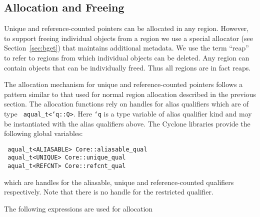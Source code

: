 \subsection{Allocation and Freeing}
\label{sec:allocandfree}

Unique and reference-counted pointers can be allocated in any
region. However, to support freeing individual objects from a region
we use a special allocator (see Section~\ref{sec:bget}) that maintains
additional metadata. We use the term ``reap'' to refer to regions from
which individual objects can be deleted. Any region can contain
objects that can be individually freed. Thus all regions are in fact
reaps. 

The allocation mechanism for unique and reference-counted pointers
follows a pattern similar to that used for normal region allocation
described in the previous section. The allocation functions rely on
handles for alias qualifiers which are of type {\tt
aqual\_t<`q::Q>}. Here {\tt `q} is a type variable of alias qualifier
kind and may be instantiated with the alias qualifiers above. The
Cyclone libraries provide the following global variables:
\begin{verbatim}
 aqual_t<ALIASABLE> Core::aliasable_qual
 aqual_t<UNIQUE> Core::unique_qual
 aqual_t<REFCNT> Core::refcnt_qual 
\end{verbatim}

which are handles for the aliasable, unique and reference-counted
qualifiers respectively. Note that there is no handle for the
restricted qualifier. 

The following expressions are used for allocation

